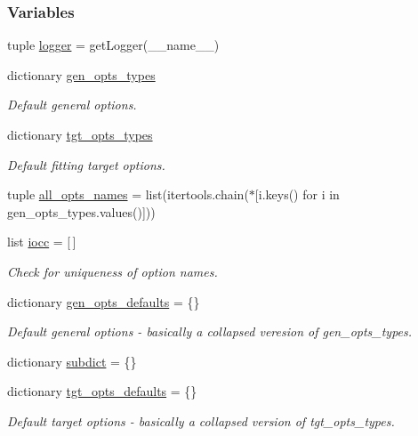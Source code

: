 \subsubsection*{Variables}
\begin{DoxyCompactItemize}
\item 
tuple \hyperlink{namespaceforcebalance_1_1parser_ab1a411e01f194a0a8fc51b5aaf4b05ac}{logger} = get\-Logger(\-\_\-\-\_\-name\-\_\-\-\_\-)
\item 
dictionary \hyperlink{namespaceforcebalance_1_1parser_a1ccdff008f4be5f63c068d2a592d69ab}{gen\-\_\-opts\-\_\-types}
\begin{DoxyCompactList}\small\item\em Default general options. \end{DoxyCompactList}\item 
dictionary \hyperlink{namespaceforcebalance_1_1parser_a95436b7fb9e99bd7b9f0a040b15fbe3a}{tgt\-\_\-opts\-\_\-types}
\begin{DoxyCompactList}\small\item\em Default fitting target options. \end{DoxyCompactList}\item 
tuple \hyperlink{namespaceforcebalance_1_1parser_ae606fd3971c0081009e4bf63d50cc92f}{all\-\_\-opts\-\_\-names} = list(itertools.\-chain($\ast$\mbox{[}i.\-keys() for i in gen\-\_\-opts\-\_\-types.\-values()\mbox{]}))
\item 
list \hyperlink{namespaceforcebalance_1_1parser_a150e23172366de5938d0f32018d0b58b}{iocc} = \mbox{[}$\,$\mbox{]}
\begin{DoxyCompactList}\small\item\em Check for uniqueness of option names. \end{DoxyCompactList}\item 
dictionary \hyperlink{namespaceforcebalance_1_1parser_a980fd024b1f2877247de482247250b9e}{gen\-\_\-opts\-\_\-defaults} = \{\}
\begin{DoxyCompactList}\small\item\em Default general options -\/ basically a collapsed veresion of gen\-\_\-opts\-\_\-types. \end{DoxyCompactList}\item 
dictionary \hyperlink{namespaceforcebalance_1_1parser_abb7a7e9723de629aa97727a85bcdbad1}{subdict} = \{\}
\item 
dictionary \hyperlink{namespaceforcebalance_1_1parser_aff4922444f06b7334a0994a835607393}{tgt\-\_\-opts\-\_\-defaults} = \{\}
\begin{DoxyCompactList}\small\item\em Default target options -\/ basically a collapsed version of tgt\-\_\-opts\-\_\-types. \end{DoxyCompactList}\item 

\end{DoxyCompactItemize}
